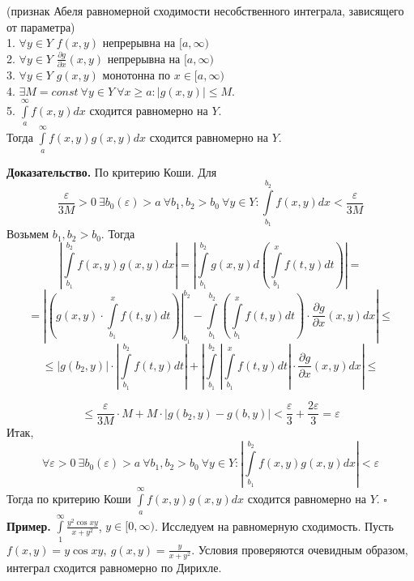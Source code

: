 \begin{theor}
    (признак Абеля равномерной сходимости несобственного интеграла, 
    зависящего от параметра)\\
    1. $\forall y\in Y$ $f(x,y)$ непрерывна на  $[a,\infty)$\\
    2. $\forall y\in Y$ $\frac{\partial g}{\partial x}(x,y)$ 
    непрерывна на  $[a,\infty)$\\
    3. $\forall y\in Y$ $g(x,y)$ монотонна по $x\in [a,\infty)$\\
    4. $\exists M=const~\forall y\in Y~\forall x\geqslant a:
    \left| g(x,y)\right|\leqslant M$.\\
    5. $\int\limits_{a}^{\infty}f(x,y)dx$ сходится равномерно на $Y$.\\
    Тогда $\int\limits_{a}^{\infty}f(x,y)g(x,y)dx$ сходится равномерно на
    $Y$.
\end{theor}
\textbf{Доказательство.}  По критерию Коши. 
Для
$$\frac{\varepsilon}{3M}>0~\exists b_0(\varepsilon)>a~\forall b_1,b_2>b_0~
\forall y\in Y: \int\limits_{b_1}^{b_2}f(x,y)dx<\frac{\varepsilon}{3M}$$ 
Возьмем $b_1,b_2>b_0$. Тогда
\begin{equation*}
\left| \int\limits_{b_1}^{b_2}f(x,y)g(x,y)dx \right| = 
\left| \int\limits_{b_1}^{b_2}g(x,y)d\left( \int\limits_{b_1}^{x}f(t,y)dt
\right)   \right| = 
\end{equation*}
$$=\left|\left.\left( g(x,y)\cdot\int\limits_{b_1}^{x}f(t,y)dt\right)\right|^{b_2}_{b_1}
- \int\limits_{b_1}^{b_2} \left( \int\limits_{b_1}^{x} f(t,y)dt \right) \cdot 
\frac{\partial g}{\partial x} (x,y)dx \right|\leqslant$$
$$\leqslant 
\left| g(b_2,y) \right|\cdot \left| \int\limits_{b_1}^{b_2}f(t,y)dt \right| +
\left| \int\limits_{b_1}^{b_2} \left| \int\limits_{b_1}^{x}f(t,y)dt\right|\cdot 
\frac{\partial g}{\partial x} (x,y)dx \right| \leqslant $$ 

$$\leqslant \frac{\varepsilon}{3M}\cdot M+
M\cdot |g(b_2,y)-g(b,y)|<\frac{\varepsilon}{3}+\frac{2\varepsilon}{3}=
\varepsilon$$ 
Итак, 
$$\forall \varepsilon>0~\exists b_0(\varepsilon)>a~\forall b_1,b_2>b_0~
\forall y\in Y:\left| \int\limits_{b_1}^{b_2}f(x,y)g(x,y)dx\right| 
<\varepsilon$$ 
Тогда по 
критерию Коши $\int\limits_{a}^{\infty}f(x,y)g(x,y)dx$ сходится равномерно на
$Y$. $\square$ \\

\textbf{Пример.} $\int\limits_{1}^{\infty} \frac{y^2\cos xy}{x+y^2}$,
$y\in [0,\infty)$. Исследуем на равномерную сходимость. Пусть
$f(x,y)=y\cos xy,~g(x,y)=\frac{y}{x+y^2}$. Условия проверяются очевидным
образом, интеграл сходится равномерно по Дирихле. 

